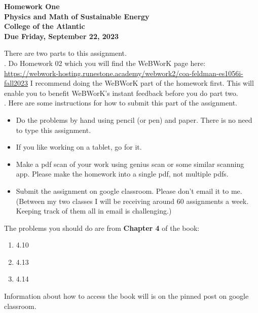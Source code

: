 \documentclass[12pt]{article}
\begin{document}
\pagestyle{empty}
 
\begin{center}
{\LARGE {\bf Homework One}}\\
\bigskip
{\Large {\bf Physics and Math of Sustainable Energy}}\\
\bigskip
{\Large {\bf College of the Atlantic}}\\
\bigskip
{ {\bf Due Friday, September 22, 2023}}\\ 
\end{center}
\medskip


\noindent There are two parts to this assignment.\\

.  Do Homework 02 which you
will find the WeBWorK page here:
\url{https://webwork-hosting.runestone.academy/webwork2/coa-feldman-es1056i-fall2023}
I recommend doing the WeBWorK part of the homework first.  This will
enable you to benefit WeBWorK's instant feedback before you do part
two.\\ 


.  Here are some
instructions for how to submit this part of the assignment.
\begin{itemize}
\item Do the problems by hand using pencil (or pen) and paper.
  There is no need to type this assignment.
\item If you like working on a tablet, go for it. 
\item Make a pdf scan of your work using genius scan or some
  similar scanning app.  Please make the homework into a single
  pdf, not multiple pdfs.
\item Submit the assignment on google classroom.  Please don't
  email it to me.  (Between my two classes I will be receiving
  around 60 assignments a week.  Keeping track of them all in email 
  is challenging.)\\
\end{itemize}

\noindent The problems you should do are from {\bf Chapter 4} of the
book:  

\begin{enumerate}
\setlength{\itemsep}{-1mm}
\item 4.10
\item 4.13
\item 4.14\\
\end{enumerate}

\noindent Information about how to access the book will is on the
pinned post on google classroom. 
\end{document}

